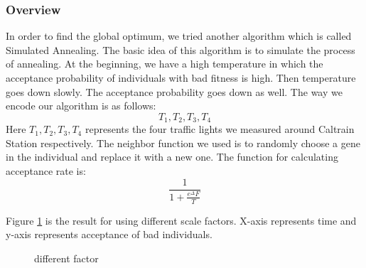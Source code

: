 \documentclass{article} %
\begin{document}
\subsubsection{Overview}
In order to find the global optimum, we tried another algorithm which is called Simulated Annealing. The basic idea of this algorithm is to simulate the process of annealing. At the beginning, we have a high temperature in which the acceptance probability of individuals with bad fitness is high. Then temperature goes down slowly. The acceptance probability goes down as well. The way we encode our algorithm is as follows:
\begin{equation}
T_1, T_2, T_3, T_4
\end{equation}
Here $T_1, T_2, T_3, T_4$ represents the four traffic lights we measured around Caltrain Station respectively.
The neighbor function we used is to randomly choose a gene in the individual and replace it with a new one.
The function for calculating acceptance rate is:
\begin{equation}
\frac{1}{1 + \frac{e^{\Delta} F}{T}}
\end{equation}

Figure \ref{fig:diff_f} is the result for using different scale factors. X-axis represents time and y-axis represents acceptance of bad individuals.
\begin{figure}[h]
 \centering
  \caption{different factor}
   \label{fig:diff_f} %
\end{figure}
\end{document}
